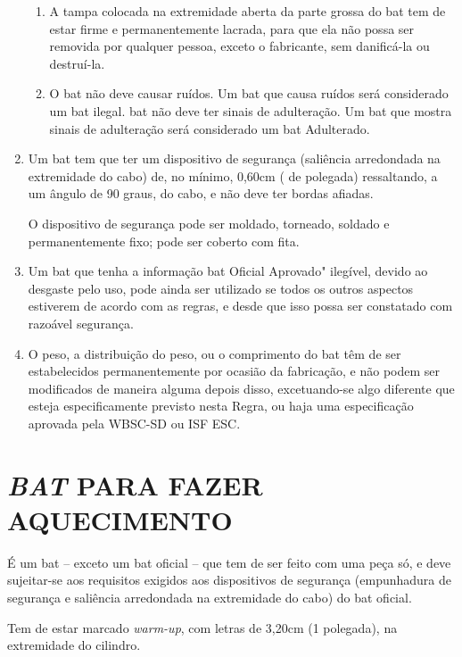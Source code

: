 \begin{enumerate}[label=(\arabic*)]
	\begin{enumerate}[label=\roman*.]
		\item A tampa colocada na extremidade aberta da parte grossa do \gls{bat} tem de estar firme e permanentemente lacrada, para que ela não possa ser removida por qualquer pessoa, exceto o fabricante, sem danificá-la ou  destruí-la.
		\item O \gls{bat} não deve causar ruídos. Um \gls{bat} que causa ruídos será considerado um \gls{bat} ilegal. \gls{bat} não deve ter sinais de adulteração. Um \gls{bat} que mostra sinais de adulteração será considerado um \gls{bat} Adulterado.
	\end{enumerate}

	\item  Um \gls{bat} tem que ter um dispositivo de segurança (saliência arredondada na extremidade do cabo) de, no mínimo, 0,60cm (\textonequarter{} de polegada) ressaltando, a um ângulo de 90 graus, do cabo, e não deve ter bordas afiadas.

	O dispositivo de segurança pode ser moldado, torneado, soldado e permanentemente fixo; pode ser coberto com fita.

	\item  Um \gls{bat} que tenha a informação \gls{bat} Oficial Aprovado" ilegível, devido ao desgaste pelo uso, pode ainda ser utilizado se todos os outros aspectos estiverem de acordo com as regras, e desde que isso possa ser constatado com razoável segurança.

	\item  O peso, a distribuição do peso, ou o comprimento do \gls{bat} têm de ser estabelecidos permanentemente por ocasião da fabricação, e não podem ser modificados de maneira alguma depois disso, excetuando-se algo diferente que esteja especificamente previsto nesta Regra, ou haja uma especificação aprovada pela WBSC-SD ou ISF \gls{ESC}.
\end{enumerate}

\section{\textit{BAT} PARA FAZER AQUECIMENTO}

É um \gls{bat} -- exceto um \gls{bat} oficial -- que tem de ser feito com uma peça só, e deve sujeitar-se aos requisitos exigidos aos dispositivos de segurança (empunhadura de segurança e saliência arredondada na extremidade do cabo) do \gls{bat} oficial.

Tem de estar marcado \textit{warm-up}, com letras de 3,20cm (1 \textonequarter{}  polegada), na extremidade do cilindro.


